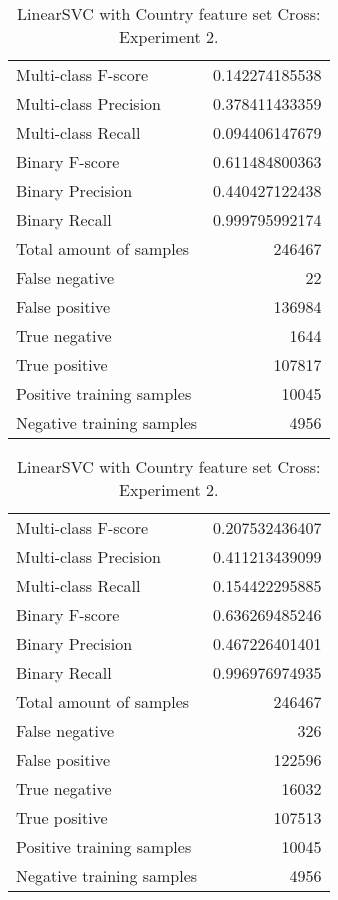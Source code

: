 \begin{table}[H]
\begin{minipage}{0.5\textwidth}
\caption{LinearSVC with Country feature set Cross: Experiment 1.}
\centering
\begin{tabular}{l r}
\toprule
Multi-class F-score & 0.142274185538 \\
Multi-class Precision & 0.378411433359 \\
Multi-class Recall & 0.094406147679 \\
\midrule
Binary F-score & 0.611484800363 \\
Binary Precision & 0.440427122438 \\
Binary Recall & 0.999795992174 \\
\midrule
Total amount of samples & 246467 \\
False negative & 22 \\
False positive & 136984 \\
True negative & 1644 \\
True positive & 107817 \\
\midrule
Positive training samples & 10045 \\
Negative training samples & 4956 \\
\bottomrule
\end{tabular}
\end{minipage}
\hfillx
\begin{minipage}{0.5\textwidth}
\caption{LinearSVC with Country feature set Cross: Experiment 2.}
\centering
\begin{tabular}{l r}
\toprule
Multi-class F-score & 0.207532436407 \\
Multi-class Precision & 0.411213439099 \\
Multi-class Recall & 0.154422295885 \\
\midrule
Binary F-score & 0.636269485246 \\
Binary Precision & 0.467226401401 \\
Binary Recall & 0.996976974935 \\
\midrule
Total amount of samples & 246467 \\
False negative & 326 \\
False positive & 122596 \\
True negative & 16032 \\
True positive & 107513 \\
\midrule
Positive training samples & 10045 \\
Negative training samples & 4956 \\
\bottomrule
\end{tabular}
\end{minipage}
\end{table}
